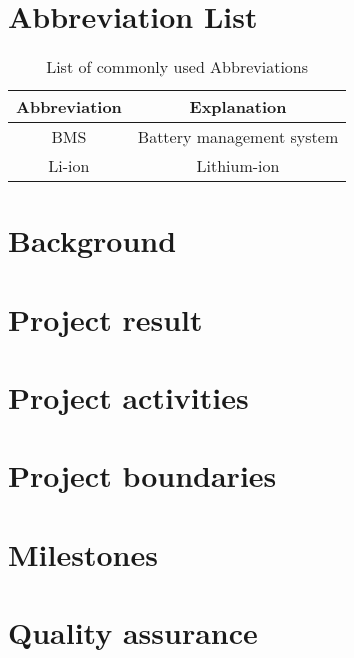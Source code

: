 \documentclass[11pt, a4paper]{report}
\begin{document}
\begin{justify}


\newpage
\tableofcontents
\thispagestyle{empty}

\listoffigures
\thispagestyle{empty}


\listoftables
\thispagestyle{empty}

\newpage
\pagestyle{plain}
\setcounter{page}{1}

\chapter*{Abbreviation List}

\begin{table}[!h]
	\centering
\begin{tabular}{|c|c|}
	\hline
\textbf{Abbreviation} & \textbf{Explanation}        \\ \hline
BMS                   & Battery management system    \\ \hline
Li-ion	              & Lithium-ion    \\ \hline
\end{tabular}
\caption{List of commonly used Abbreviations}
\label{Abbreviation list}
\end{table}

\chapter{Background}
	

\chapter{Project result}
	
	
\chapter{Project activities}
	

\chapter{Project boundaries}
	
	
\chapter{Milestones}
	

\chapter{Quality assurance}
	


\end{justify}
\end{document}
